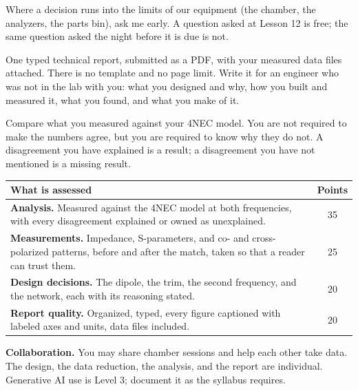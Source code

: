 \documentclass{exam}
\newcommand{\head}[1]{\par\vspace{6pt}{\large\bfseries #1}\par\vspace{-2pt}}
\begin{document}
Where a decision runs into the limits of our equipment (the chamber, the
analyzers, the parts bin), ask me early. A question asked at Lesson 12 is free;
the same question asked the night before it is due is not.

\head{The Report}

One typed technical report, submitted as a PDF, with your measured data files
attached. There is no template and no page limit. Write it for an engineer who
was not in the lab with you: what you designed and why, how you built and
measured it, what you found, and what you make of it.

Compare what you measured against your 4NEC model. You are not required to
make the numbers agree, but you are required to know why they do not. A
disagreement you have explained is a result; a disagreement you have not
mentioned is a missing result.

\head{Grading}

\begin{center}
\begin{tabular}{|p{4.9in}|c|}
\hline
\textbf{What is assessed} & \textbf{Points} \\
\hline
\textbf{Analysis.} Measured against the 4NEC model at both frequencies, with every
disagreement explained or owned as unexplained. & 35 \\
\hline
\textbf{Measurements.} Impedance, S-parameters, and co- and cross-polarized
patterns, before and after the match, taken so that a reader can trust them. & 25 \\
\hline
\textbf{Design decisions.} The dipole, the trim, the second frequency, and the
network, each with its reasoning stated. & 20 \\
\hline
\textbf{Report quality.} Organized, typed, every figure captioned with labeled
axes and units, data files included. & 20 \\
\hline
\end{tabular}
\end{center}

\textbf{Collaboration.} You may share chamber sessions and help each other take
data. The design, the data reduction, the analysis, and the report are
individual. Generative AI use is Level 3; document it as the syllabus requires.
\end{document}
